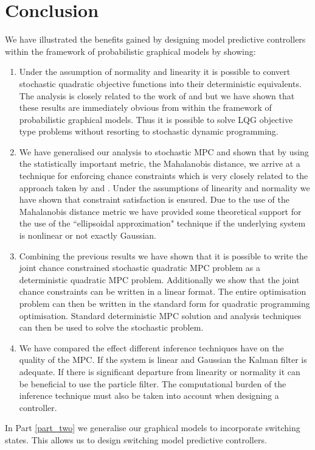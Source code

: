 \section{Conclusion}
We have illustrated the benefits gained by designing model predictive controllers within the framework of probabilistic graphical models by showing:
\begin{enumerate}
\item
Under the assumption of normality and linearity it is possible to convert stochastic quadratic objective functions into their deterministic equivalents. The analysis is closely related to the work of \cite{yan1} and \cite{yan2} but we have shown that these results are immediately obvious from within the framework of probabilistic graphical models. Thus it is possible to solve LQG objective type problems without resorting to stochastic dynamic programming.
\item
We have generalised our analysis to stochastic MPC and shown that by using the statistically important metric, the Mahalanobis distance, we arrive at a technique for enforcing chance constraints which is very closely related to the approach taken by \cite{vanhessem2} and \cite{vanhessem1}. Under the assumptions of linearity and normality we have shown that constraint satisfaction is ensured. Due to the use of the Mahalanobis distance metric we have provided some theoretical support for the use of the ``ellipsoidal approximation" technique if the underlying system is nonlinear or not exactly Gaussian.
\item
Combining the previous results we have shown that it is possible to write the joint chance constrained stochastic quadratic MPC problem as a deterministic quadratic MPC problem. Additionally we show that the joint chance constraints can be written in a linear format. The entire optimisation problem can then be written in the standard form for quadratic programming optimisation. Standard deterministic MPC solution and analysis techniques can then be used to solve the stochastic problem.
\item
We have compared the effect different inference techniques have on the quality of the MPC. If the system is linear and Gaussian the Kalman filter is adequate. If there is significant departure from linearity or normality it can be beneficial to use the particle filter. The computational burden of the inference technique must also be taken into account when designing a controller.
\end{enumerate}
In Part \ref{part_two} we generalise our graphical models to incorporate switching states. This allows us to design switching model predictive controllers.